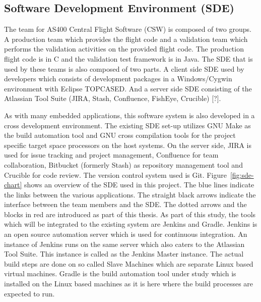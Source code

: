 \documentclass[12pt, a4paper, titlepage]{scrartcl}
\begin{document}
\subsection{Software Development Environment (SDE)}
\par The team for AS400 Central Flight Software (CSW) is composed of two groups. A production team which provides the flight code and a validation team which performs the validation activities on the provided flight code. The production flight code is in C and the validation test framework is in Java. The SDE that is used by these teams is also composed of two parts. A client side SDE used by developers which consists of development packages in a Windows/Cygwin environment with Eclipse TOPCASED.  And a server side SDE consisting of the Atlassian Tool Suite (JIRA, Stash, Confluence, FishEye, Crucible) [?]. 
\par As with many embedded applications, this software system is also developed in a cross development environment\cite{rtemsIntro}. The existing SDE set-up utilizes GNU Make\cite{GNUMakeManual} as the build automation tool and GNU cross compilation tools for the project specific target space processors on the host systems. On the server side, JIRA is used for issue tracking and project management, Confluence for team collaboration, Bitbucket (formerly Stash) as repository management tool and Crucible for code review. The version control system used is Git\cite{GitflowWorkflow}. 
Figure~\ref{fig:sde-chart} shows an overview of the SDE used in this project. The blue lines indicate the links between the various applications. The straight black arrows indicate the interface between the team members and the SDE. The dotted arrows and the blocks in red are introduced as part of this thesis. As part of this study, the tools which will be integrated to the existing system are Jenkins and Gradle. Jenkins is an open source automation server which is used for continuous integration. An instance of Jenkins runs on the same server which also caters to the Atlassian Tool Suite. This instance is called as the Jenkins Master instance. The actual build steps are done on so called Slave Machines which are separate Linux based virtual machines. Gradle is the build automation tool under study which is installed on the Linux based machines as it is here where the build processes are expected to run.
\end{document}
